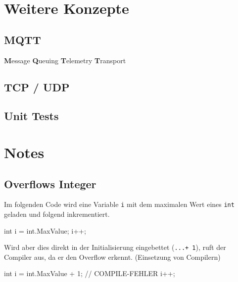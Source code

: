 \documentclass[
  9pt,
  a4paperpaper,
  DIV=11]{scrartcl}
\newenvironment{Shaded}{}{}
\newcommand{\CommentTok}[1]{\textcolor[rgb]{0.42,0.45,0.49}{#1}}
\newcommand{\DataTypeTok}[1]{\textcolor[rgb]{0.84,0.23,0.29}{#1}}
\newcommand{\DecValTok}[1]{\textcolor[rgb]{0.00,0.36,0.77}{#1}}
\newcommand{\FunctionTok}[1]{\textcolor[rgb]{0.44,0.26,0.76}{#1}}
\newcommand{\NormalTok}[1]{\textcolor[rgb]{0.14,0.16,0.18}{#1}}
\newcommand{\OperatorTok}[1]{\textcolor[rgb]{0.14,0.16,0.18}{#1}}
\numberwithin{equation}{section}
\begin{document}
\begin{multicols}{2}
\begin{tcolorbox}
\begin{tcolorbox}
\begin{tcolorbox}
\begin{tcolorbox}
\begin{tcolorbox}
\begin{tcolorbox}
\begin{tcolorbox}
\hypertarget{weitere-konzepte}{%
\section{Weitere Konzepte}\label{weitere-konzepte}}

\hypertarget{mqtt}{%
\subsection{MQTT}\label{mqtt}}

\textbf{M}essage \textbf{Q}ueuing \textbf{T}elemetry \textbf{T}ransport

\hypertarget{tcp-udp}{%
\subsection{TCP / UDP}\label{tcp-udp}}

\hypertarget{unit-tests}{%
\subsection{Unit Tests}\label{unit-tests}}

\hypertarget{notes}{%
\section{Notes}\label{notes}}

\hypertarget{overflows-integer}{%
\subsection{Overflows Integer}\label{overflows-integer}}

Im folgenden Code wird eine Variable \texttt{i} mit dem maximalen Wert
eines \texttt{int} geladen und folgend inkrementiert.

\begin{Shaded}
\begin{Highlighting}[]
\DataTypeTok{int}\NormalTok{ i }\OperatorTok{=} \DataTypeTok{int}\OperatorTok{.}\FunctionTok{MaxValue}\OperatorTok{;}
\NormalTok{i}\OperatorTok{++;}
\end{Highlighting}
\end{Shaded}

Wird aber dies direkt in der Initialisierung eingebettet
(\texttt{...+\ 1}), ruft der Compiler aus, da er den Overflow erkennt.
(Einsetzung von Compilern)

\begin{Shaded}
\begin{Highlighting}[]
\DataTypeTok{int}\NormalTok{ i }\OperatorTok{=} \DataTypeTok{int}\OperatorTok{.}\FunctionTok{MaxValue} \OperatorTok{+} \DecValTok{1}\OperatorTok{;} \CommentTok{// COMPILE{-}FEHLER}
\NormalTok{i}\OperatorTok{++;}
\end{Highlighting}
\end{Shaded}


\end{tcolorbox}
\end{tcolorbox}
\end{tcolorbox}
\end{tcolorbox}
\end{tcolorbox}
\end{tcolorbox}
\end{tcolorbox}
\end{multicols}
\end{document}
